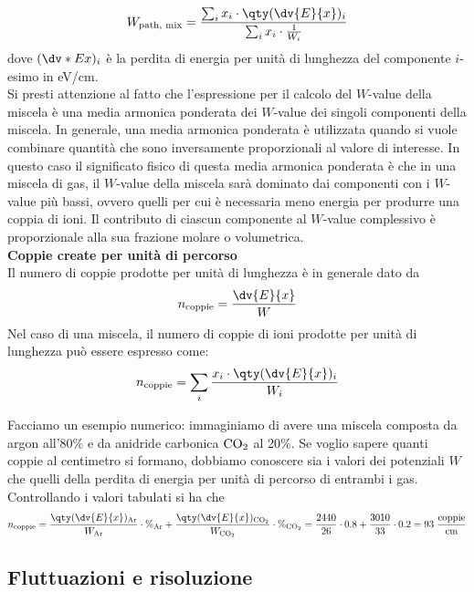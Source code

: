 \begin{approfondimento}
   \begin{equation*}
      W_{\text{path, mix}}
      =\frac{\sum_i x_i \cdot \qty( \dv{E}{x} )_i}{\sum_i x_i \cdot \frac{1}{W_i}}
   \end{equation*}
   dove $(\dv*{E}{x})_i$ è la perdita di energia per unità di lunghezza del componente $i$-esimo in eV/cm.\\
   Si presti attenzione al fatto che l'espressione per il calcolo del $W$-value della miscela è una media armonica ponderata dei $W$-value dei singoli componenti della miscela. In generale, una media armonica ponderata è utilizzata quando si vuole combinare quantità che sono inversamente proporzionali al valore di interesse. In questo caso il significato fisico di questa media armonica ponderata è che in una miscela di gas, il $W$-value della miscela sarà dominato dai componenti con i $W$-value più bassi, ovvero quelli per cui è necessaria meno energia per produrre una coppia di ioni. Il contributo di ciascun componente al $W$-value complessivo è proporzionale alla sua frazione molare o volumetrica.\\[0.2cm]
   \textbf{Coppie create per unità di percorso}\\
   Il numero di coppie prodotte per unità di lunghezza è in generale dato da
   \begin{equation*}
      n_{\rm coppie}=\frac{\dv{E}{x}}{W}
   \end{equation*}
   Nel caso di una miscela, il numero di coppie di ioni prodotte per unità di lunghezza può essere espresso come:
   \begin{equation*}
      n_{\rm coppie}
      =\sum_i \frac{x_i \cdot \qty( \dv{E}{x} )_i}{W_i}
   \end{equation*}
\end{approfondimento}

Facciamo un esempio numerico: immaginiamo di avere una miscela composta da argon all'80\% e da anidride carbonica $\rm CO_2$ al 20\%. Se voglio sapere quanti coppie al centimetro si formano, dobbiamo conoscere sia i valori dei potenziali $W$ che quelli della perdita di energia per unità di percorso di entrambi i gas. Controllando i valori tabulati si ha che
\begin{equation*}
   n_{\rm coppie}
   =\frac{\qty(\dv{E}{x})_{\rm Ar}}{W_{\rm Ar}} \cdot \%_{\rm Ar} + \frac{\qty(\dv{E}{x})_{\rm CO_2}}{W_{\rm CO_2}} \cdot \%_{\rm CO_2}
   =\frac{2440}{26} \cdot 0.8 + \frac{3010}{33} \cdot 0.2
   =93 \; \rm \frac{coppie}{cm}
\end{equation*}
\subsection{Fluttuazioni e risoluzione}

